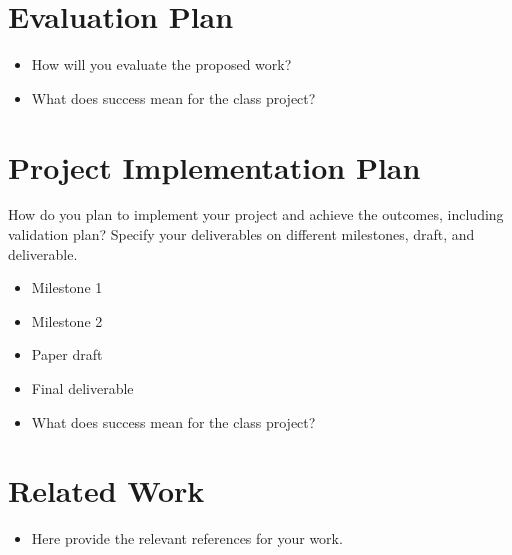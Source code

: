 \documentclass[sigconf]{acmart}
\begin{document}
\section{Evaluation Plan}

\begin{itemize}
    \item How will you evaluate the proposed work?
    \item What does success mean for the class project?
\end{itemize}


\section{Project Implementation Plan}
How do you plan to implement your project and achieve the outcomes, including validation plan? Specify your deliverables on different milestones, draft, and deliverable. 


\begin{itemize}
    \item Milestone 1 
    \item Milestone 2 
	\item Paper draft 
	\item Final deliverable 
    \item What does success mean for the class project?
\end{itemize}


\section{Related Work}
\begin{itemize}
    \item Here provide the relevant references for your work. 
\end{itemize}
	
\end{document}
